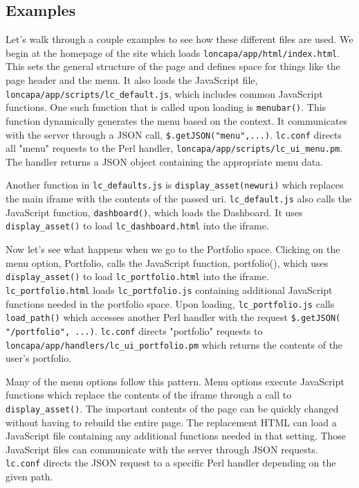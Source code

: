 \subsection{Examples}
Let's walk through a couple examples to see how these different files are used.  We begin at the homepage of the site which loads {\tt loncapa/app/html/index.html}.  This sets the general structure of the page and defines space for things like the page header and the menu.  It also loads the JavaScript file, {\tt loncapa/app/scripts/lc\_default.js}, which includes common JavaScript functions.  One such function that is called upon loading is {\tt menubar()}.  This function dynamically generates the menu based on the context.  It communicates with the server through a JSON call, {\tt \$.getJSON("menu",...)}.  {\tt  lc.conf} directs all "menu" requests to the Perl handler, {\tt loncapa/app/scripts/lc\_ui\_menu.pm}.  The handler returns a JSON object containing the appropriate menu data.

Another function in {\tt lc\_defaults.js} is {\tt display\_asset(newuri)} which replaces the main iframe with the contents of the passed uri.  {\tt lc\_default.js} also calls the JavaScript function, {\tt dashboard()}, which loads the Dashboard.  It uses {\tt display\_asset()} to load {\tt lc\_dashboard.html} into the iframe.

Now let's see what happens when we go to the Portfolio space.  Clicking on the menu option, Portfolio, calls the JavaScript function, portfolio(), which uses {\tt display\_asset()} to load {\tt lc\_portfolio.html} into the iframe.  {\tt lc\_portfolio.html} loads {\tt lc\_portfolio.js} containing additional JavaScript functions needed in the portfolio space.  Upon loading, {\tt lc\_portfolio.js} calls {\tt load\_path()} which accesses another Perl handler with the request {\tt \$.getJSON( "/portfolio", ...)}.  {\tt lc.conf} directs "portfolio" requests to {\tt loncapa/app/handlers/lc\_ui\_portfolio.pm} which returns the contents of the user's portfolio.

Many of the menu options follow this pattern.  Menu options execute JavaScript functions which replace the contents of the iframe through a call to {\tt display\_asset()}.  The important contents of the page can be quickly changed without having to rebuild the entire page.  The replacement HTML can load a JavaScript file containing any additional functions needed in that setting.  Those JavaScript files can communicate with the server through JSON requests. {\tt lc.conf} directs the JSON request to  a specific Perl handler depending on the given path.

